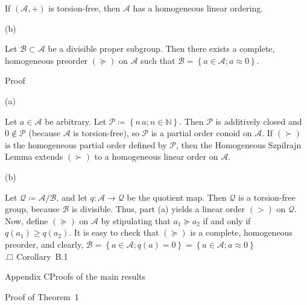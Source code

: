 \documentclass[
]{article}
\begin{document}
If \(\left( \mathcal{A}, + \right)\) is torsion-free, then
\(\mathcal{A}\) has a homogeneous linear ordering.

(b)

Let \(\mathcal{B} \subset \mathcal{A}\) be a divisible proper subgroup.
Then there exists a complete, homogeneous preorder \(( \succeq )\) on
\(\mathcal{A}\) such that
\(\mathcal{B} = \left\{ a \in \mathcal{A};a \approx 0 \right\}\).

Proof

(a)

Let \(a \in \mathcal{A}\) be arbitrary. Let
\(\mathcal{P} ≔ \left\{ n\, a;n \in \mathbb{N} \right\}\). Then
\(\mathcal{P}\) is additively closed and \(0 \notin \mathcal{P}\)
(because \(\mathcal{A}\) is torsion-free), so \(\mathcal{P}\) is a
partial order conoid on \(\mathcal{A}\). If \(( \succ )\) is the
homogeneous partial order defined by \(\mathcal{P}\), then the
Homogeneous Szpilrajn Lemma extends \(( \succ )\) to a homogeneous
linear order on \(\mathcal{A}\).

(b)

Let \(\mathcal{Q} ≔ \mathcal{A}/\mathcal{B}\), and let
\(\left. q:\mathcal{A}\longrightarrow\mathcal{Q} \right.\) be the
quotient map. Then \(\mathcal{Q}\) is a torsion-free group, because
\(\mathcal{B}\) is divisible. Thus, part (a) yields a linear order
\(( > )\) on \(\mathcal{Q}\). Now, define \(( \succeq )\) on
\(\mathcal{A}\) by stipulating that \(a_{1} \succeq a_{2}\) if and only
if \(q\left( a_{1} \right) \geq q\left( a_{2} \right)\). It is easy to
check that \(( \succeq )\) is a complete, homogeneous preorder, and
clearly,
\(\mathcal{B} = \left\{ a \in \mathcal{A};q(a) = 0 \right\} = \left\{ a \in \mathcal{A};a \approx 0 \right\}\).□~Corollary~B.1

\protect{}\label{s000035}
Appendix CProofs of the main results

Proof of Theorem~1
\end{document}
